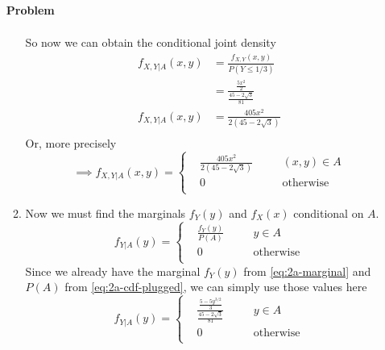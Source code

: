 \documentclass[12pt]{article}
\newenvironment{Ex}{\textbf{Problem}\vspace{.75em}\\}{}
\begin{document}
\begin{enumerate}
\begin{Ex}
\begin{solution}
\begin{enumerate}
\begin{equation}
\begin{aligned}
          \end{aligned}
        \end{equation}
        So now we can obtain the conditional joint density
        \begin{equation}
          \label{eq:2a-conditional-joint-density-plugged}
          \begin{aligned}
            f_{X,Y|A}(x,y) &= \frac{f_{X,Y}(x,y)}{P(Y \le 1/3)} \\
            &= \frac{\frac{5x^2}{2}}{\frac{45-2\sqrt{3}}{81}} \\
            f_{X,Y|A}(x,y) &= \frac{405x^2}{2(45-2\sqrt{3})} \\
          \end{aligned}
        \end{equation}
        Or, more precisely
        \begin{equation}
          \label{eq:2a-sol}
          \implies f_{X,Y|A}(x,y) = \left\{
            \begin{aligned}
              & \frac{405x^2}{2(45-2\sqrt{3})} &&\quad (x,y) \in A \\
              & 0 &&\quad\text{otherwise} \\
            \end{aligned}\right.
        \end{equation}
      \item Now we must find the marginals $f_Y(y)$ and $f_X(x)$
        conditional on $A$.
        \begin{equation}
          \label{eq:2b-fy-def}
          f_{Y|A}(y) = \left\{
            \begin{aligned}
              & \frac{f_Y(y)}{P(A)} &&\quad y \in A \\
              & 0 &&\quad\text{otherwise} \\
            \end{aligned}\right.
        \end{equation}
        Since we already have the marginal $f_Y(y)$ from
        \cref{eq:2a-marginal} and $P(A)$ from
        \cref{eq:2a-cdf-plugged}, we can simply use those values here
        \begin{equation}
          \label{eq:2b-fy-presol}
          f_{Y|A}(y) = \left\{
            \begin{aligned}
              & \frac{\frac{5-5y^{3/2}}{3}}{\frac{45-2\sqrt{3}}{81}}
              &&\quad y \in A \\
              & 0 &&\quad\text{otherwise} \\

\end{aligned}
\end{equation}
\end{enumerate}
\end{solution}
\end{Ex}
\end{enumerate}
\end{document}

